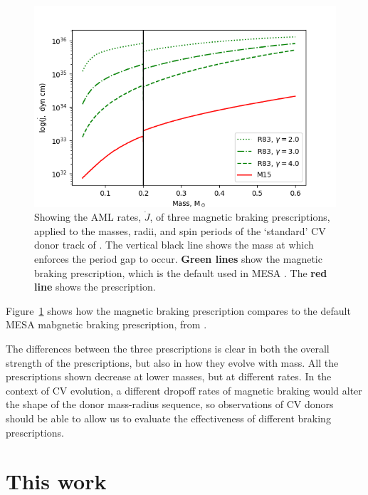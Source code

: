 \begin{figure}
    \centering
    \includegraphics[width=\textwidth, trim={1cm 0 0 0}]{figures/introduction/rappaport_matt_magbraking.png}
    \caption{Showing the AML rates, $\dot J$, of three magnetic braking prescriptions, applied to the masses, radii, and spin periods of the `standard' CV donor track of \citet{knigge11}. The vertical black line shows the mass at which \citet{knigge11} enforces the period gap to occur. {\bf Green lines} show the \citet{rappaport1983} magnetic braking prescription, which is the default used in MESA \citep{Paxton_2015}. The {\bf red line} shows the \citet{matt2015} prescription.}
    \label{fig:introduction:rappaport garraffo matt magnetic braking}
\end{figure}

Figure~\ref{fig:introduction:rappaport garraffo matt magnetic braking} shows how the \citet{matt2015} magnetic braking prescription compares to the default MESA mabgnetic braking prescription, from \citet{rappaport1983}. 

The differences between the three prescriptions is clear in both the overall strength of the prescriptions, but also in how they evolve with mass. All the prescriptions shown decrease at lower masses, but at different rates. In the context of CV evolution, a different dropoff rates of magnetic braking would alter the shape of the donor mass-radius sequence, so observations of CV donors should be able to allow us to evaluate the effectiveness of different braking prescriptions.



\section{This work}
\label{sect:introduction:this work}